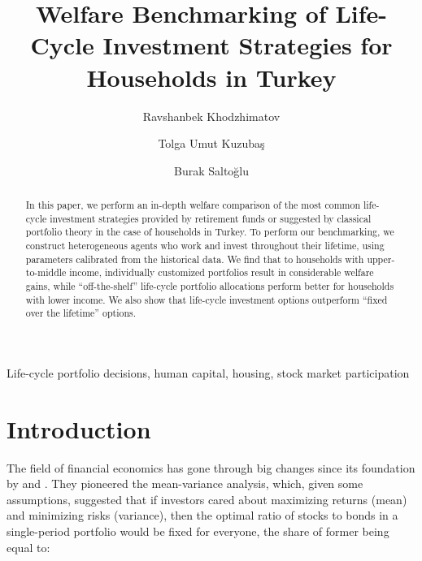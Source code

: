 \documentclass[]{elsarticle}
\begin{document}

\begin{frontmatter}


\title{Welfare Benchmarking of Life-Cycle Investment Strategies for Households in Turkey}


\author{Ravshanbek Khodzhimatov}
\author{Tolga Umut Kuzubaş}
\author{Burak Saltoğlu}

\address{Boğaziçi University, Department of Economics, Natuk Birkan Building, 34342 Bebek, Istanbul, Turkey}


\begin{abstract}
In this paper, we perform an in-depth welfare comparison of the most common life-cycle investment strategies provided by retirement funds or suggested by classical portfolio theory in the case of households in Turkey. To perform our benchmarking, we construct heterogeneous agents who work and invest throughout their lifetime, using parameters calibrated from the historical data. We find that to households with upper-to-middle income, individually customized portfolios result in considerable welfare gains, while ``off-the-shelf'' life-cycle portfolio allocations perform better for households with lower income. We also show that life-cycle investment options outperform ``fixed over the lifetime'' options. 
\end{abstract}


\begin{keyword}
	Life-cycle portfolio decisions, human capital, housing, stock market participation
\end{keyword}


\end{frontmatter}


\section{Introduction} %
\label{intro} %

The field of financial economics has gone through big changes since its foundation by \citet{markowitz} and \citet{tobin}. They pioneered the mean-variance analysis, which, given some assumptions, suggested that if investors cared about maximizing returns (mean) and minimizing risks (variance), then the optimal ratio of stocks to bonds in a single-period portfolio would be fixed for everyone, the share of former being equal to:
\end{document}
